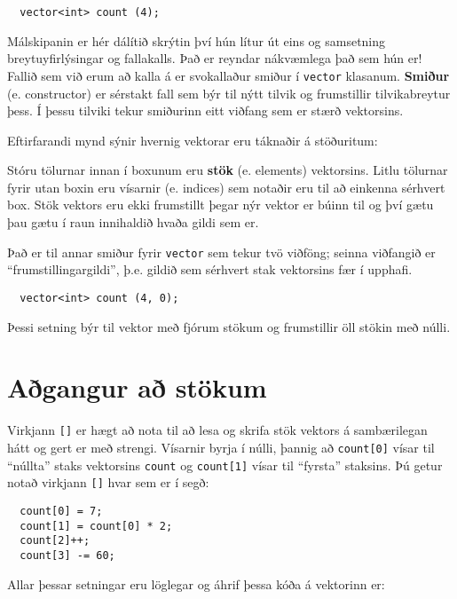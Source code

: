 \begin{verbatim}
  vector<int> count (4);
\end{verbatim}
%
Málskipanin er hér dálítið skrýtin því hún lítur út eins og samsetning breytuyfirlýsingar og fallakalls.
Það er reyndar nákvæmlega það sem hún er!
Fallið sem við erum að kalla á er svokallaður smiður í {\tt vector} klasanum.
{\bf Smiður} (e. constructor) er sérstakt fall sem býr til nýtt tilvik og frumstillir tilvikabreytur þess.
Í þessu tilviki tekur smiðurinn eitt viðfang sem er stærð vektorsins.


Eftirfarandi mynd sýnir hvernig vektorar eru táknaðir á stöðuritum:

\vspace{0.1in}
\centerline{}
\vspace{0.1in}

Stóru tölurnar innan í boxunum eru {\bf stök} (e. elements) vektorsins. 
Litlu tölurnar fyrir utan boxin eru vísarnir (e. indices) sem notaðir eru til að einkenna sérhvert box.
Stök vektors eru ekki frumstillt þegar nýr vektor er búinn til og því gætu þau gætu í raun innihaldið hvaða gildi sem er.

Það er til annar smiður fyrir {\tt vector} sem tekur tvö viðföng; seinna viðfangið er ``frumstillingargildi'', þ.e. gildið sem sérhvert stak vektorsins fær í upphafi.

\begin{verbatim}
  vector<int> count (4, 0);
\end{verbatim}
%
Þessi setning býr til vektor með fjórum stökum og frumstillir öll stökin með núlli.

\section{Aðgangur að stökum}

Virkjann {\tt []} er hægt að nota til að lesa og skrifa stök vektors á sambærilegan hátt og gert er með strengi.
Vísarnir byrja í núlli, þannig að {\tt count[0]} vísar til ``núllta'' staks vektorsins {\tt count} og
{\tt count[1]} vísar til ``fyrsta'' staksins.
Þú getur notað virkjann {\tt []} hvar sem er í segð:

\begin{verbatim}
  count[0] = 7;
  count[1] = count[0] * 2;
  count[2]++;
  count[3] -= 60;
\end{verbatim}
%
Allar þessar setningar eru löglegar og áhrif þessa kóða á vektorinn er: 

